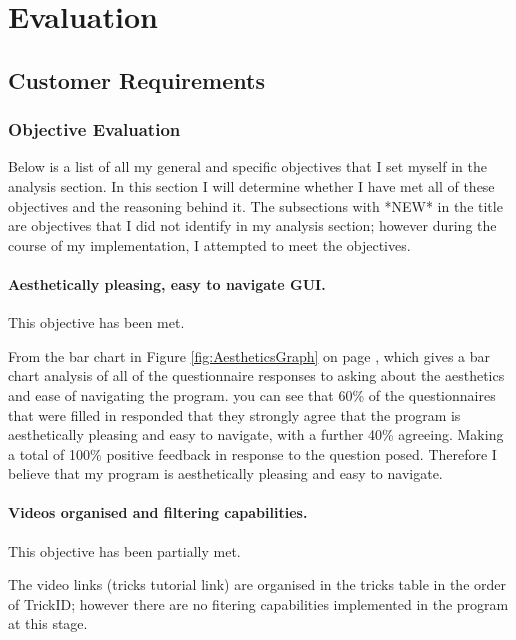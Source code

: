 \chapter{Evaluation}

\section{Customer Requirements}


\subsection{Objective Evaluation}

Below is a list of all my general and specific objectives that I set myself in the analysis section. In this section I will determine whether I have met all of these objectives and the reasoning behind it. The subsections with *NEW* in the title are objectives that I did not identify in my analysis section; however during the course of my implementation, I attempted to meet the objectives. 

\subsubsection{Aesthetically pleasing, easy to navigate GUI.} %

This objective has been met.

From the bar chart in Figure \ref{fig:AestheticsGraph} on page \pageref{fig:AestheticsGraph}, which gives a bar chart analysis of all of the questionnaire responses to asking about the aesthetics and ease of navigating the program. you can see that 60\% of the questionnaires that were filled in responded that they strongly agree that the program is aesthetically pleasing and easy to navigate, with a further 40\% agreeing. Making a total of 100\% positive feedback in response to the question posed. Therefore I believe that my program is aesthetically pleasing and easy to navigate.




\subsubsection{Videos organised and filtering capabilities.}

This objective has been partially met. 

The video links (tricks tutorial link) are organised in the tricks table in the order of TrickID; however there are no fitering capabilities implemented in the program at this stage. 


